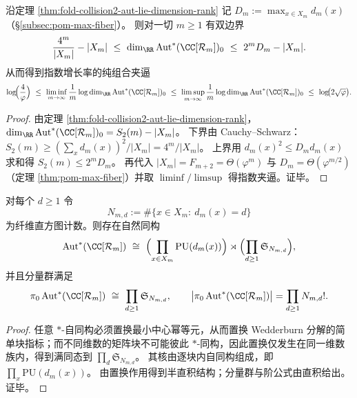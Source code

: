 \begin{theorem}[连续规范对称维度的黄金夹逼]\label{thm:fold-aut-dimension-golden-squeeze}
沿定理 \ref{thm:fold-collision2-aut-lie-dimension-rank} 记 \(D_m:=\max_{x\in X_m}d_m(x)\)（\S\ref{subsec:pom-max-fiber}）。
则对一切 \(m\ge 1\) 有双边界
\[
\frac{4^m}{|X_m|}-|X_m|
\ \le\
\dim_{\RR}\mathrm{Aut}^{\ast}(\CC[\mathcal{R}_m])_0
\ \le\
2^mD_m-|X_m|.
\]
从而得到指数增长率的纯组合夹逼
\[
\log\!\Bigl(\frac4\varphi\Bigr)
\ \le\
\liminf_{m\to\infty}\frac1m\log \dim_{\RR}\mathrm{Aut}^{\ast}(\CC[\mathcal{R}_m])_0
\ \le\
\limsup_{m\to\infty}\frac1m\log \dim_{\RR}\mathrm{Aut}^{\ast}(\CC[\mathcal{R}_m])_0
\ \le\
\log\!\bigl(2\sqrt\varphi\bigr).
\]
\end{theorem}
\begin{proof}
由定理 \ref{thm:fold-collision2-aut-lie-dimension-rank}，\(\dim_{\RR}\mathrm{Aut}^{\ast}(\CC[\mathcal{R}_m])_0=S_2(m)-|X_m|\)。
下界由 Cauchy--Schwarz：
\(
S_2(m)\ge (\sum_x d_m(x))^2/|X_m|=4^m/|X_m|
\)。
上界用 \(d_m(x)^2\le D_m d_m(x)\) 求和得 \(S_2(m)\le 2^mD_m\)。
再代入 \(|X_m|=F_{m+2}=\Theta(\varphi^m)\) 与 \(D_m=\Theta(\varphi^{m/2})\)（定理 \ref{thm:pom-max-fiber}）并取 \(\liminf/\limsup\) 得指数夹逼。证毕。
\end{proof}

\begin{theorem}\label{thm:fold-groupoid-aut-semidirect-pi0}
对每个 \(d\ge 1\) 令
\[
N_{m,d}:=\#\{x\in X_m:\ d_m(x)=d\}
\]
为纤维直方图计数。则存在自然同构
\[
\mathrm{Aut}^{\ast}(\CC[\mathcal{R}_m])
\ \cong\
\Bigl(\prod_{x\in X_m}\mathrm{PU}(d_m(x))\Bigr)\rtimes
\Bigl(\prod_{d\ge 1}\mathfrak{S}_{N_{m,d}}\Bigr),
\]
并且分量群满足
\[
\pi_0\,\mathrm{Aut}^{\ast}(\CC[\mathcal{R}_m])
\ \cong\ \prod_{d\ge 1}\mathfrak{S}_{N_{m,d}},
\qquad
\bigl|\pi_0\,\mathrm{Aut}^{\ast}(\CC[\mathcal{R}_m])\bigr|
=\prod_{d\ge 1} N_{m,d}!.
\]
\end{theorem}
\begin{proof}
任意 \(\ast\)-自同构必须置换最小中心幂等元，从而置换 Wedderburn 分解的简单块指标；而不同维数的矩阵块不可能彼此 \(\ast\)-同构，因此置换仅发生在同一维数族内，得到满同态到 \(\prod_d\mathfrak{S}_{N_{m,d}}\)。
其核由逐块内自同构组成，即 \(\prod_x\mathrm{PU}(d_m(x))\)。
由置换作用得到半直积结构；分量群与阶公式由直积给出。证毕。
\end{proof}

